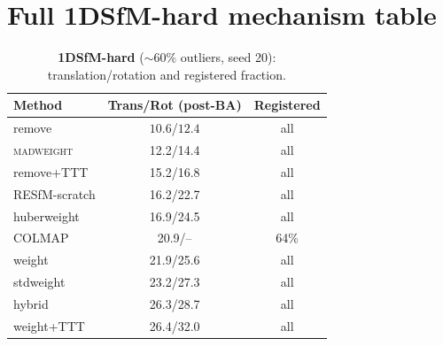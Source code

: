 \documentclass[10pt,twocolumn,letterpaper]{article}
\newcommand{\mad}{\textsc{madweight}}
\begin{document}
\section{Full 1DSfM-hard mechanism table}
\begin{table}[h]\centering\small
\caption{\textbf{1DSfM-hard} ($\sim\!60\%$ outliers, seed 20): translation/rotation
and registered fraction.}
\label{tab:hard}
\begin{tabular}{lcc}
\toprule
Method & Trans/Rot (post-BA) & Registered\\
\midrule
remove & $\mathbf{10.6}$/$\mathbf{12.4}$ & all\\
\mad{} & 12.2/14.4 & all\\
remove+TTT & 15.2/16.8 & all\\
RESfM-scratch              & 16.2/22.7 & all\\
huberweight & 16.9/24.5 & all\\
COLMAP                     & 20.9/--   & 64\%\\
weight & 21.9/25.6 & all\\
stdweight & 23.2/27.3 & all\\
hybrid & 26.3/28.7 & all\\
weight+TTT & 26.4/32.0 & all\\
\bottomrule
\end{tabular}
\end{table}
\end{document}
